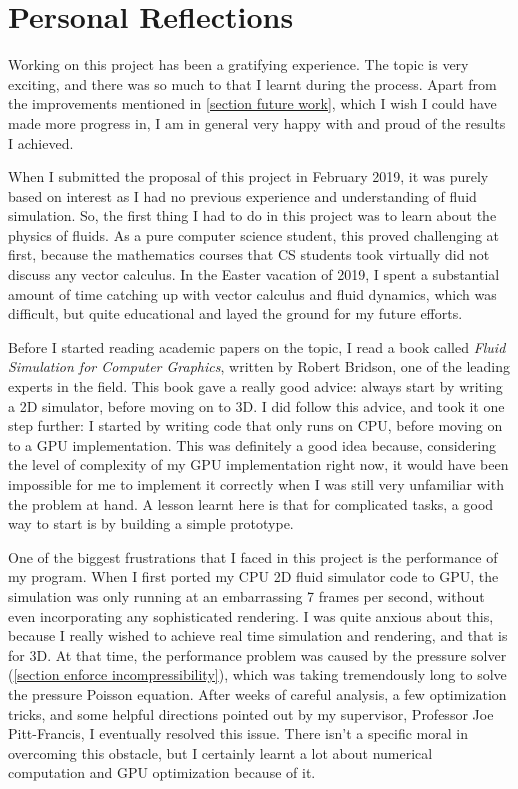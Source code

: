 \section{Personal Reflections}
Working on this project has been a gratifying experience. The topic is very exciting, and there was so much to that I learnt during the process. Apart from the improvements mentioned in \ref{section future work}, which I wish I could have made more progress in, I am in general very happy with and proud of the results I achieved.

When I submitted the proposal of this project in February 2019, it was purely based on interest as I had no previous experience and understanding of fluid simulation. So, the first thing I had to do in this project was to learn about the physics of fluids. As a pure computer science student, this proved challenging at first, because the mathematics courses that CS students took virtually did not discuss any vector calculus. In the Easter vacation of 2019, I spent a substantial amount of time catching up with vector calculus and fluid dynamics, which was difficult, but quite educational and layed the ground for my future efforts.

Before I started reading academic papers on the topic, I read a book called \textit{Fluid Simulation for Computer Graphics}\cite{bridson2015fluid}, written by Robert Bridson, one of the leading experts in the field. This book gave a really good advice: always start by writing a 2D simulator, before moving on to 3D. I did follow this advice, and took it one step further: I started by writing code that only runs on CPU, before moving on to a GPU implementation. This was definitely a good idea because, considering the level of complexity of my GPU implementation right now, it would have been impossible for me to implement it correctly when I was still very unfamiliar with the problem at hand. A lesson learnt here is that for complicated tasks, a good way to start is by building a simple prototype.

One of the biggest frustrations that I faced in this project is the performance of my program. When I first ported my CPU 2D fluid simulator code to GPU, the simulation was only running at an embarrassing 7 frames per second, without even incorporating any sophisticated rendering. I was quite anxious about this, because I really wished to achieve real time simulation and rendering, and that is for 3D. At that time, the performance problem was caused by the pressure solver (\ref{section enforce incompressibility}), which was taking tremendously long to solve the pressure Poisson equation. After weeks of careful analysis, a few optimization tricks, and some helpful directions pointed out by my supervisor, Professor Joe Pitt-Francis, I eventually resolved this issue. There isn't a specific moral in overcoming this obstacle, but I certainly learnt a lot about numerical computation and GPU optimization because of it.

